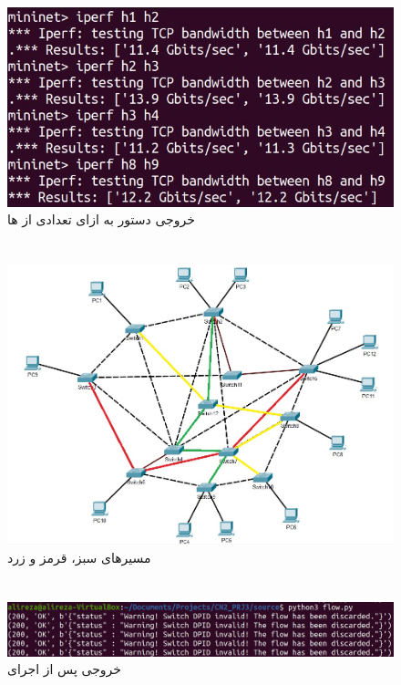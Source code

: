 \documentclass{article}
\begin{document}
\begin{figure}[H]
    \centering
    \includegraphics[width=1.0\textwidth]{figures/5.jpg}
    \caption
	{
خروجی دستور  به ازای تعدادی از ها
	}
    \label{fig:fig1}
\end{figure}


\section{}
\begin{figure}[H]
    \centering
    \includegraphics[width=1.0\textwidth]{figures/6.jpg}
    \caption
	{
مسیرهای سبز، قرمز و زرد
	}
    \label{fig:fig1}
\end{figure}

\section{}
\begin{figure}[H]
    \centering
    \includegraphics[width=1.0\textwidth]{figures/7.jpg}
    \caption
	{
خروجی پس از اجرای 
	}
    \label{fig:fig1}
\end{figure}
\end{document}
